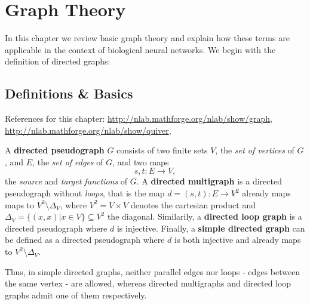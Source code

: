 \chapter{Graph Theory}\label{ch:Graph_theory} 
In this chapter we review basic graph theory and explain how these
terms are applicable in the context of biological neural networks. We
begin with the definition of directed graphs:

\section{Definitions \& Basics}

References for this chapter:
\url{http://nlab.mathforge.org/nlab/show/graph},
\url{http://nlab.mathforge.org/nlab/show/quiver}, \parencite{Bang-Jensen_Digraphs} 






\begin{definition}
  A \textbf{directed pseudograph} $G$ consists of two finite  sets $V$, the \textit{set of vertices} of $G$, and
  $E$, the \textit{set of edges} of $G$, and two maps
  \[
  s,t: E \to V,
  \]
  the \textit{source} and \textit{target functions} of $G$. A
  \textbf{directed multigraph} is a directed pseudograph without
  \textit{loops}, that is the map $d = (s,t):E \to V^2$ already maps
  maps to $V^2\setminus\Delta_V$, where $V^2 = V \times V$ denotes the
  cartesian product and $\Delta_V = \{(x,x)|x \in V\} \subseteq V^2$
  the diagonal. Similarily, a \textbf{directed loop graph} is a
  directed pseudograph where $d$ is injective. Finally, a
  \textbf{simple directed graph} can be defined as a directed
  pseudograph where $d$ is both injective and already maps to
  $V^2\setminus\Delta_V$.
\end{definition}
Thus, in simple directed graphs, neither parallel edges nor loops -
edges between the same vertex - are allowed, whereas directed
multigraphs and directed loop graphs admit one of them respectively.

